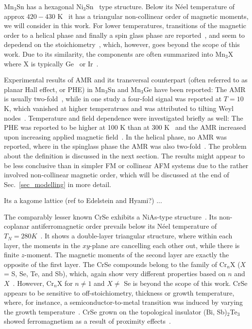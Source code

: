 \documentclass[prb,showpacs,amsmath,amssymb,superscriptaddress,twocolumn,floatfix]{revtex4-1}
\begin{document}
Mn$_3$Sn has a hexagonal Ni$_3$Sn~\cite{Nakatsuji:2015} type structure. Below its N\'eel temperature of approx $420-430$ K~\cite{Sharma:2023, Cable:1993, Nakatsuji:2015, Zhou:2020, Chen:2021, Ikhlas:2017} it has a triangular non-collinear order of magnetic moments, we will consider in this work. For lower temperatures, transitions of the magnetic order to a helical phase and finally a spin glass phase are reported~\cite{Park:2018, Sharma:2023,Chen:2021}, and seem to depedend on the stoichiometry~\cite{Park:2018}, which, however, goes beyond the scope of this work. Due to its similarity, the components are often summarized into Mn$_3$X~\cite{Chen:2021} where X is typically Ge~\cite{Sharma:2023, Manna:2018, Wu:2023, Chen:2021, Cable:1993} or Ir~\cite{Gonzalez-Hernandez:2024,Zelezny:2017}.

Experimental results of AMR and its transversal counterpart (often referred to as planar Hall effect, or PHE) in Mn$_3$Sn and Mn$_3$Ge have been reported: The AMR is usually two-fold~\cite{Sharma:2023, Chen:2021,Wu:2023}, while in one study a four-fold signal was reported at $ T = 10$ K, which vanished at higher temperatrues and was attributed to tilting Weyl nodes~\cite{Wu:2023}. Temperature and field dependence were investigated briefly as well: The PHE was reported to be higher at 100 K than at 300 K~\cite{Chen:2021} and the AMR increased upon increasing applied magnetic field~\cite{Sharma:2023}. In the helical phase, no AMR was reported, where in the spinglass phase the AMR was also two-fold~\cite{Sharma:2023}. The problem about the definition is discussed in the next section. The results might appear to be less conclusive than in simpler FM or collinear AFM systems due to the rather involved non-collinear magnetic order, which will be discussed at the end of Sec.~\ref{sec_modelling} in more detail.


{\color{red} Its a kagome lattice (ref to Edelstein and Hyami?) ... }


The comparably lesser known CrSe exhibits a NiAs-type structure~\cite{Corliss:1961}. Its non-coplanar antiferromagnetic order prevails below its N\'eel temperature of $T_N = 280K$~\cite{Tajima:2024, Polesya:2010}. It shows a double-layer triangular structure, where within each layer, the moments in the $xy$-plane are cancelling each other out, while there is finite $z$-moment. The magnetic moments of the second layer are exactly the opposite of the first layer. The CrSe compounds belong to the family of Cr$_n$X ($X$ = S, Se, Te, and Sb), which, again show very different properties based on $n$ and $X$~\cite{Tajima:2024, Polesya:2010}. However, Cr$_n$X for $n \neq 1$ and $X \neq$ Se is beyond the scope of this work. CrSe appears to be sensitive to off-stoichiometry, thickness or growth temperature, where, for instance, a semiconductor-to-metal transition was induced by varying the growth temperature~\cite{Tajima:2024}. CrSe grown on the topological insulator (Bi, Sb)$_2$Te$_3$ showed ferromagnetism as a result of proximity effects~\cite{Yang:2020}. \\
\end{document}
